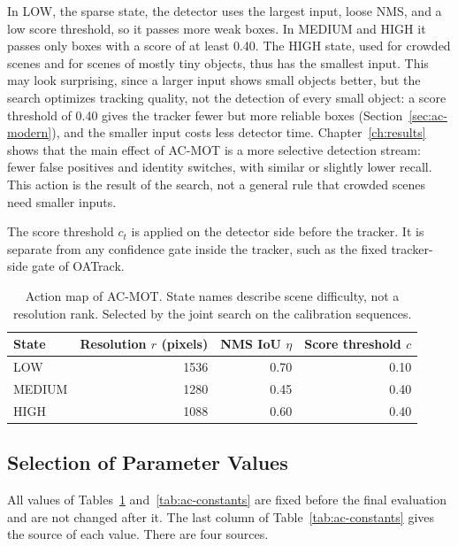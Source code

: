 In LOW, the sparse state, the detector uses the largest input, loose NMS, and a low score threshold, so it passes more weak boxes. In MEDIUM and HIGH it passes only boxes with a score of at least 0.40. The HIGH state, used for crowded scenes and for scenes of mostly tiny objects, thus has the smallest input. This may look surprising, since a larger input shows small objects better, but the search optimizes tracking quality, not the detection of every small object: a score threshold of 0.40 gives the tracker fewer but more reliable boxes (Section~\ref{sec:ac-modern}), and the smaller input costs less detector time. Chapter~\ref{ch:results} shows that the main effect of AC-MOT is a more selective detection stream: fewer false positives and identity switches, with similar or slightly lower recall. This action is the result of the search, not a general rule that crowded scenes need smaller inputs.

The score threshold $c_t$ is applied on the detector side before the tracker. It is separate from any confidence gate inside the tracker, such as the fixed tracker-side gate of OATrack.

\begin{table}[tbp]
\centering
\caption{Action map of AC-MOT. State names describe scene difficulty, not a resolution rank. Selected by the joint search on the calibration sequences.}
\label{tab:ac-actions}
\begin{tabular}{lrrr}
\toprule
State & Resolution $r$ (pixels) & NMS IoU $\eta$ & Score threshold $c$\\
\midrule
LOW & 1536 & 0.70 & 0.10\\
MEDIUM & 1280 & 0.45 & 0.40\\
HIGH & 1088 & 0.60 & 0.40\\
\bottomrule
\end{tabular}
\end{table}

\subsection{Selection of Parameter Values}\label{sec:ac-constants}
All values of Tables~\ref{tab:ac-actions} and~\ref{tab:ac-constants} are fixed before the final evaluation and are not changed after it. The last column of Table~\ref{tab:ac-constants} gives the source of each value. There are four sources.


